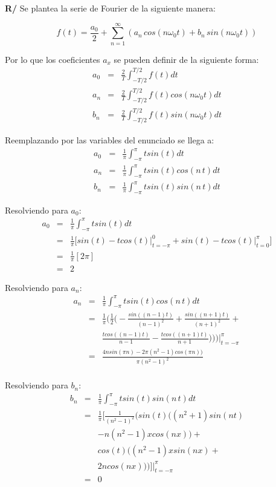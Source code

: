 \documentclass[twocolumn]{article}
\begin{document}
\textbf{R/} Se plantea la serie de Fourier de la siguiente manera:

$$f(t) = \frac{a_0}{2} + \sum_{n=1}^\infty\left(a_n\,cos(n\omega_0t) + b_n\,sin(n\omega_0t)\right)$$

Por lo que los coeficientes $a_x$ se pueden definir de la siguiente forma:
\begin{eqnarray*}
a_0 &=& \frac{2}{T}\int_{-T/2}^{T/2}f(t)dt\\
a_n &=& \frac{2}{T}\int_{-T/2}^{T/2}f(t)cos(n\omega_0t)dt\\
b_n &=& \frac{2}{T}\int_{-T/2}^{T/2}f(t)sin(n\omega_0t)dt
\end{eqnarray*}

Reemplazando por las variables del enunciado se llega a:
\begin{eqnarray*}
a_0 &=& \frac{1}{\pi}\int_{-\pi}^{\pi}tsin(t)dt\\
a_n &=& \frac{1}{\pi}\int_{-\pi}^{\pi}tsin(t)cos(n\,t)dt\\
b_n &=& \frac{1}{\pi}\int_{-\pi}^{\pi}tsin(t)sin(n\,t)dt
\end{eqnarray*}

Resolviendo para $a_0$:
\begin{eqnarray*}
a_0 &=& \frac{1}{\pi}\int_{-\pi}^{\pi}tsin(t)dt\\
&=& \frac{1}{\pi} \bigg[ sin(t) -tcos(t)\bigg|_{t=-\pi}^{0} + sin(t) -tcos(t)\bigg|_{t=0}^{\pi} \bigg] \\
&=& \frac{1}{\pi} [2\pi]\\
&=& 2
\end{eqnarray*}

Resolviendo para $a_n$:
\begin{eqnarray*}
a_n &=& \frac{1}{\pi}\int_{-\pi}^{\pi}tsin(t)cos(n\,t)dt\\
&=& \frac{1}{\pi} \bigg(\frac{1}{2}\bigg(-\frac{sin((n-1)t)}{(n-1)^{2}} + \frac{sin((n+1)t)}{(n+1)^{2}}+ \\
& & \frac{tcos((n-1)t)}{n-1} - \frac{tcos((n+1)t)}{n+1})\bigg)\bigg)\bigg|_{t=-\pi}^{\pi}\\
&=& \frac{4nsin(\pi n)-2\pi(n^{2}-1)cos(\pi n))}{\pi(n^{2}- 1)^{2}}\\
\end{eqnarray*}

Resolviendo para $b_n$:
\begin{eqnarray*}
b_n &=& \frac{1}{\pi}\int_{-\pi}^{\pi}tsin(t)sin(n\,t)dt\\
&=& \frac{1}{\pi} \bigg[\frac{1}{(n^{2}-1)^{2}}(sin(t)((n^{2}+1)sin(nt) \\
& & -n(n^{2}-1)xcos(nx))+ \\
& & cos(t)((n^{2}-1)xsin(nx) + \\
& &2ncos(nx)))\bigg]\bigg|_{t=-\pi}^{\pi}\\
&=& 0
\end{eqnarray*}
\end{document}

